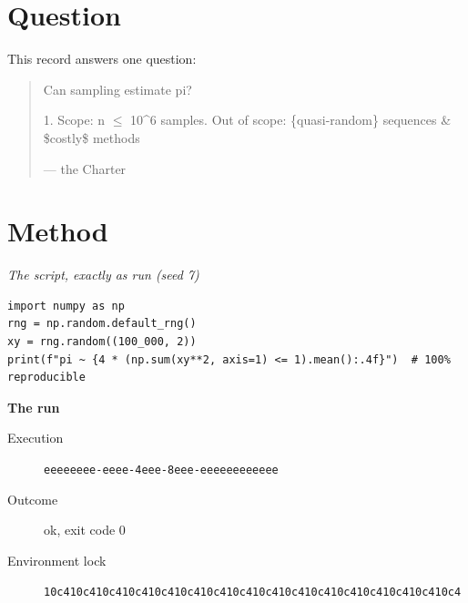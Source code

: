 \documentclass{article}
\newcommand{\sheepquote}[2]{\begin{quote}\small #1\par\nopagebreak\raggedleft--- #2\end{quote}}
\begin{document}
\printAffiliationsAndNotice{}
\begin{abstract}
This is the record of one research session on the question: can sampling estimate pi?
Of 2 findings, 1 is supported and 1 refuted.
\end{abstract}

\section{Question}

This record answers one question:

\sheepquote{Can sampling estimate pi?

1. Scope: n $\leq$ 10\textasciicircum{}6 samples\newline
2. Out of scope: \{quasi-random\} sequences \& \$costly\$ methods}{the Charter}

\section{Method}

\noindent\textit{The script, exactly as run (seed 7)}
\begin{lstlisting}
import numpy as np
rng = np.random.default_rng()
xy = rng.random((100_000, 2))
print(f"pi ~ {4 * (np.sum(xy**2, axis=1) <= 1).mean():.4f}")  # 100% reproducible
\end{lstlisting}

\noindent\textbf{The run}
\begin{description}
\item[Execution] \texttt{eeeeeeee\allowbreak{}-\allowbreak{}eeee\allowbreak{}-\allowbreak{}4eee\allowbreak{}-\allowbreak{}8eee\allowbreak{}-\allowbreak{}eeeeeeee\allowbreak{}eeee}
\item[Outcome] ok, exit code 0
\item[Environment lock] \texttt{10c410c4\allowbreak{}10c410c4\allowbreak{}10c410c4\allowbreak{}10c410c4\allowbreak{}10c410c4\allowbreak{}10c410c4\allowbreak{}10c410c4\allowbreak{}10c410c4}
\end{description}
\end{document}

